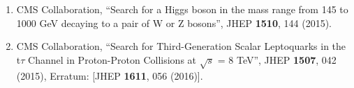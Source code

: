 \begin{itemize}
\begin{enumerate}
\item CMS Collaboration, ``Search for a Higgs boson in the mass range from 145 to 1000 GeV decaying to a pair of W or Z bosons'', JHEP {\bf 1510}, 144 (2015).

\item CMS Collaboration, ``Search for Third-Generation Scalar Leptoquarks in the t$\tau$ Channel in Proton-Proton Collisions at $\sqrt{s}$ = 8 TeV'', JHEP {\bf 1507}, 042 (2015), Erratum: [JHEP {\bf 1611}, 056 (2016)].

\end{enumerate}
\end{itemize}
\fontsize{12pt}{12pt}\selectfont
